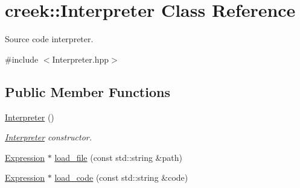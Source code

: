 \hypertarget{classcreek_1_1_interpreter}{}\section{creek\+:\+:Interpreter Class Reference}
\label{classcreek_1_1_interpreter}


Source code interpreter.  




{\ttfamily \#include $<$Interpreter.\+hpp$>$}

\subsection*{Public Member Functions}
\begin{DoxyCompactItemize}
\item 
\hyperlink{classcreek_1_1_interpreter_a862d4b6539936f6ca709dd8fb085e3f5}{Interpreter} ()\hypertarget{classcreek_1_1_interpreter_a862d4b6539936f6ca709dd8fb085e3f5}{}\label{classcreek_1_1_interpreter_a862d4b6539936f6ca709dd8fb085e3f5}

\begin{DoxyCompactList}\small\item\em {\ttfamily \hyperlink{classcreek_1_1_interpreter}{Interpreter}} constructor. \end{DoxyCompactList}\item 
\hyperlink{classcreek_1_1_expression}{Expression} $\ast$ \hyperlink{classcreek_1_1_interpreter_a18a16a3b26702377076fdd102169c736}{load\+\_\+file} (const std\+::string \&path)
\item 
\hyperlink{classcreek_1_1_expression}{Expression} $\ast$ \hyperlink{classcreek_1_1_interpreter_ad41f2a6445dedc524fc15a80b023b4be}{load\+\_\+code} (const std\+::string \&code)
\end{DoxyCompactItemize}
